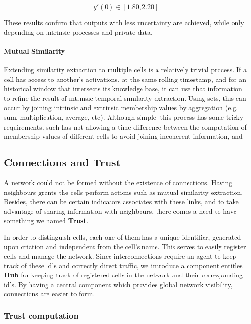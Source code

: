 \begin{equation}
    y'(0) \in [1.80, 2.20]
\end{equation}

These results confirm that outputs with less uncertainty are achieved, while only depending on intrinsic processes and private data.

\paragraph{Mutual Similarity}
Extending similarity extraction to multiple cells is a relatively trivial process. If a cell has access to another's activations, at the same rolling timestamp, and for an historical window that intersects its knowledge base, it can use that information to refine the result of intrinsic temporal similarity extraction. Using sets, this can occur by joining intrinsic and extrinsic membership values by aggregation (e.g. sum, multiplication, average, etc).
Although simple, this process has some tricky requirements, such has not allowing a time difference between the computation of membership values of different cells to avoid joining incoherent information, and 

\subsection{Connections and Trust}

A network could not be formed without the existence of connections. Having neighbours grants the cells perform actions such as mutual similarity extraction. Besides, there can be certain indicators associates with these links, and to take advantage of sharing information with neighbours, there comes a need to have something we named \textbf{Trust}.

In order to distinguish cells, each one of them has a unique identifier, generated upon criation and independent from the cell's name. This serves to easily register cells and manage the network. Since interconnections require an agent to keep track of these id's and correctly direct traffic, we introduce a component entitles \textbf{Hub} for keeping track of registered cells in the network and their corresponding id's. By having a central component which provides global network visibility, connections are easier to form.


\subsubsection{Trust computation}



